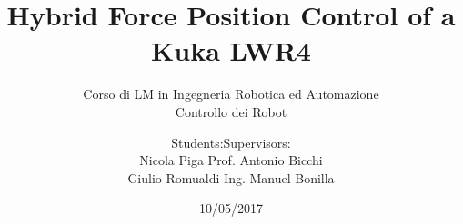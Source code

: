 \documentclass{beamer}
\date{10/05/2017}
\title[]{Hybrid Force Position Control of a Kuka LWR4}
\subtitle{Corso di LM in Ingegneria Robotica ed Automazione \\
  Controllo dei Robot}
\author{Students:\hfill Supervisors:\\
Nicola Piga \hfill Prof. Antonio Bicchi\\
Giulio Romualdi \hfill Ing. Manuel Bonilla}
\institute[]{Università di Pisa}
\begin{document}

\begin{frame}
  \maketitle
\end{frame}










\end{document}

